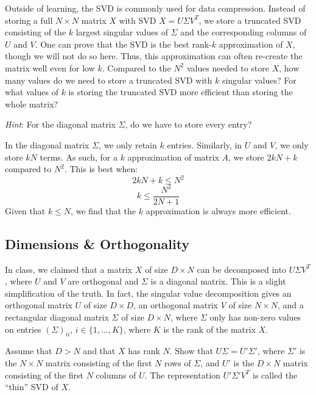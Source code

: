 \problem[3] Outside of learning, the SVD is commonly used for data compression. Instead of storing a full $N \times N$ matrix $X$ with SVD $X = U\Sigma V^T$, we store a truncated SVD consisting of the $k$ largest singular values of $\Sigma$ and the corresponding columns of $U$ and $V$. One can prove that the SVD is the best rank-$k$ approximation of $X$, though we will not do so here. Thus, this approximation can often re-create the matrix well even for low $k$. Compared to the $N^2$ values needed to store $X$, how many values do we need to store a truncated SVD with $k$ singular values? For what values of $k$ is storing the truncated SVD more efficient than storing the whole matrix?

\textit{Hint}: For the diagonal matrix $\Sigma$, do we have to store every entry?

\begin{solution}
 In the diagonal matrix $\Sigma$, we only retain $k$ entries. Similarly, in $U$ and $V$, we only store $kN$ terms. As such, for a $k$ approximation of matrix $A$, we store $2kN+k$ compared to $N^2$. This is best when:
 \begin{equation}
	 2kN+k \leq N^2
 \end{equation}
 \begin{equation}
	 k \leq \frac{N^2}{2N+1}
 \end{equation} 
 Given that $k\leq N$, we find that the $k$ approximation is always more efficient.
\end{solution}

\subsection{Dimensions \& Orthogonality} In class, we claimed that a matrix $X$ of size $D \times N$ can be decomposed into $U\Sigma V^T$, where $U$ and $V$ are orthogonal and $\Sigma$ is a diagonal matrix. This is a slight simplification of the truth. In fact, the singular value decomposition gives an orthogonal matrix $U$ of size $D \times D$, an orthogonal matrix $V$ of size $N \times N$, and a rectangular diagonal matrix $\Sigma$ of size $D \times N$, where $\Sigma$ only has non-zero values on entries $(\Sigma)_{ii}$, $i \in \{1, \ldots, K\}$, where $K$ is the rank of the matrix $X$. 

\problem[3] Assume that $D > N$ and that $X$ has rank $N$. Show that $U\Sigma = U'\Sigma'$, where $\Sigma'$ is the $N \times N$ matrix consisting of the first $N$ rows of $\Sigma$, and $U'$ is the $D \times N$ matrix consisting of the first $N$ columns of $U$. The representation $U'\Sigma' V^T$ is called the ``thin'' SVD of $X$.

